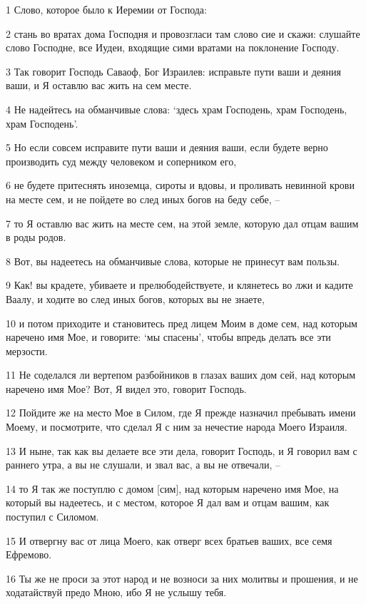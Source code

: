 \par 1 Слово, которое было к Иеремии от Господа:
\par 2 стань во вратах дома Господня и провозгласи там слово сие и скажи: слушайте слово Господне, все Иудеи, входящие сими вратами на поклонение Господу.
\par 3 Так говорит Господь Саваоф, Бог Израилев: исправьте пути ваши и деяния ваши, и Я оставлю вас жить на сем месте.
\par 4 Не надейтесь на обманчивые слова: `здесь храм Господень, храм Господень, храм Господень'.
\par 5 Но если совсем исправите пути ваши и деяния ваши, если будете верно производить суд между человеком и соперником его,
\par 6 не будете притеснять иноземца, сироты и вдовы, и проливать невинной крови на месте сем, и не пойдете во след иных богов на беду себе, --
\par 7 то Я оставлю вас жить на месте сем, на этой земле, которую дал отцам вашим в роды родов.
\par 8 Вот, вы надеетесь на обманчивые слова, которые не принесут вам пользы.
\par 9 Как! вы крадете, убиваете и прелюбодействуете, и клянетесь во лжи и кадите Ваалу, и ходите во след иных богов, которых вы не знаете,
\par 10 и потом приходите и становитесь пред лицем Моим в доме сем, над которым наречено имя Мое, и говорите: `мы спасены', чтобы впредь делать все эти мерзости.
\par 11 Не соделался ли вертепом разбойников в глазах ваших дом сей, над которым наречено имя Мое? Вот, Я видел это, говорит Господь.
\par 12 Пойдите же на место Мое в Силом, где Я прежде назначил пребывать имени Моему, и посмотрите, что сделал Я с ним за нечестие народа Моего Израиля.
\par 13 И ныне, так как вы делаете все эти дела, говорит Господь, и Я говорил вам с раннего утра, а вы не слушали, и звал вас, а вы не отвечали, --
\par 14 то Я так же поступлю с домом [сим], над которым наречено имя Мое, на который вы надеетесь, и с местом, которое Я дал вам и отцам вашим, как поступил с Силомом.
\par 15 И отвергну вас от лица Моего, как отверг всех братьев ваших, все семя Ефремово.
\par 16 Ты же не проси за этот народ и не возноси за них молитвы и прошения, и не ходатайствуй предо Мною, ибо Я не услышу тебя.
